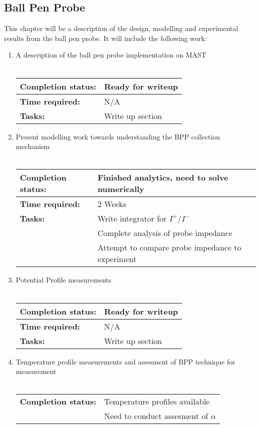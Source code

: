 \documentclass[11pt]{article}
\begin{document}
\subsection{Ball Pen Probe}
This chapter will be a description of the design, modelling and experimental results from the ball pen probe. It will include the following work:
\begin{enumerate}
\item A description of the ball pen probe implementation on MAST \\ \\
\begin{tabular}{l l}
\hline
\textbf{Completion status:} &  Ready for writeup \\
\hline
  \textbf{Time required:} & N/A \\
\hline
\textbf{Tasks:} & Write up section
\end{tabular}
\item Present modelling work towards understanding the BPP collection mechanism \\ \\
\begin{tabular}{l l}
\hline
\textbf{Completion status:} &  Finished analytics, need to solve numerically \\
\hline
  \textbf{Time required:} & 2 Weeks \\
\hline
\textbf{Tasks:} & Write integrator for $I^{+}/I^{-}$ \\
 & Complete analysis of probe impedance \\
 & Attempt to compare probe impedance to experiment
\end{tabular}
\item Potential Profile measurements\\ \\
\begin{tabular}{l l}
\hline
\textbf{Completion status:} &  Ready for writeup \\
\hline
  \textbf{Time required:} & N/A \\
\hline
\textbf{Tasks:} & Write up section
\end{tabular}
\item Temperature profile measurements and assesment of BPP technique for measurement\\ \\
\begin{tabular}{l l}
\hline
\textbf{Completion status:} & Temperature profiles available \\
 & Need to conduct assesment of $\alpha$\\

\end{tabular}
\end{enumerate}
\end{document}
